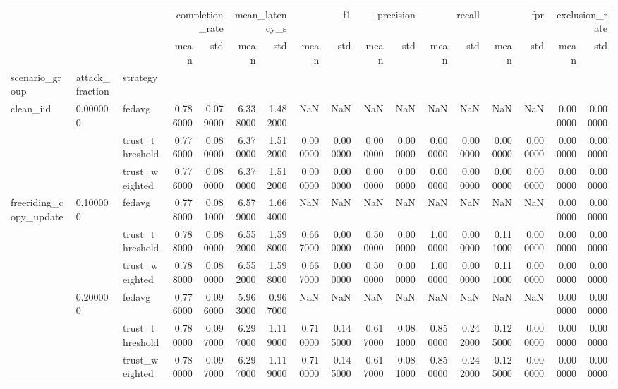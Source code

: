 \begin{tabular}{lllrrrrrrrrrrrrrr}
\toprule
 &  &  & \multicolumn{2}{r}{completion_rate} & \multicolumn{2}{r}{mean_latency_s} & \multicolumn{2}{r}{f1} & \multicolumn{2}{r}{precision} & \multicolumn{2}{r}{recall} & \multicolumn{2}{r}{fpr} & \multicolumn{2}{r}{exclusion_rate} \\
 &  &  & mean & std & mean & std & mean & std & mean & std & mean & std & mean & std & mean & std \\
scenario_group & attack_fraction & strategy &  &  &  &  &  &  &  &  &  &  &  &  &  &  \\
\midrule
\multirow[t]{3}{*}{clean_iid} & \multirow[t]{3}{*}{0.000000} & fedavg & 0.786000 & 0.079000 & 6.338000 & 1.482000 & NaN & NaN & NaN & NaN & NaN & NaN & NaN & NaN & 0.000000 & 0.000000 \\
 &  & trust_threshold & 0.776000 & 0.080000 & 6.370000 & 1.512000 & 0.000000 & 0.000000 & 0.000000 & 0.000000 & 0.000000 & 0.000000 & 0.000000 & 0.000000 & 0.000000 & 0.000000 \\
 &  & trust_weighted & 0.776000 & 0.080000 & 6.370000 & 1.512000 & 0.000000 & 0.000000 & 0.000000 & 0.000000 & 0.000000 & 0.000000 & 0.000000 & 0.000000 & 0.000000 & 0.000000 \\
\cline{1-17} \cline{2-17}
\multirow[t]{12}{*}{freeriding_copy_update} & \multirow[t]{3}{*}{0.100000} & fedavg & 0.778000 & 0.081000 & 6.579000 & 1.664000 & NaN & NaN & NaN & NaN & NaN & NaN & NaN & NaN & 0.000000 & 0.000000 \\
 &  & trust_threshold & 0.788000 & 0.080000 & 6.552000 & 1.598000 & 0.667000 & 0.000000 & 0.500000 & 0.000000 & 1.000000 & 0.000000 & 0.111000 & 0.000000 & 0.000000 & 0.000000 \\
 &  & trust_weighted & 0.788000 & 0.080000 & 6.552000 & 1.598000 & 0.667000 & 0.000000 & 0.500000 & 0.000000 & 1.000000 & 0.000000 & 0.111000 & 0.000000 & 0.000000 & 0.000000 \\
\cline{2-17}
 & \multirow[t]{3}{*}{0.200000} & fedavg & 0.776000 & 0.096000 & 5.963000 & 0.967000 & NaN & NaN & NaN & NaN & NaN & NaN & NaN & NaN & 0.000000 & 0.000000 \\
 &  & trust_threshold & 0.780000 & 0.097000 & 6.297000 & 1.119000 & 0.710000 & 0.145000 & 0.617000 & 0.081000 & 0.850000 & 0.242000 & 0.125000 & 0.000000 & 0.000000 & 0.000000 \\
 &  & trust_weighted & 0.780000 & 0.097000 & 6.297000 & 1.119000 & 0.710000 & 0.145000 & 0.617000 & 0.081000 & 0.850000 & 0.242000 & 0.125000 & 0.000000 & 0.000000 & 0.000000 \\

\end{tabular}
